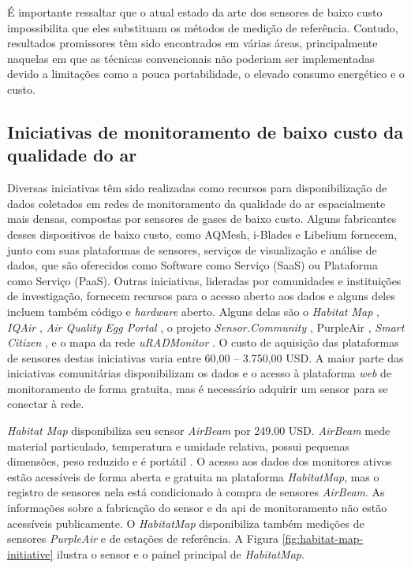É importante ressaltar que o atual estado da arte dos sensores de baixo custo impossibilita que eles substituam os métodos de medição de referência. Contudo, resultados promissores têm sido encontrados em várias áreas, principalmente naquelas em que as técnicas convencionais não poderiam ser implementadas devido a limitações como a pouca portabilidade, o elevado consumo energético e o custo.

\subsection{Iniciativas de monitoramento de baixo custo da qualidade do ar}

Diversas iniciativas têm sido realizadas como recursos para disponibilização de dados coletados em redes de monitoramento da qualidade do ar espacialmente mais densas, compostas por sensores de gases de baixo custo. Alguns fabricantes desses dispositivos de baixo custo, como AQMesh, i-Blades e Libelium fornecem, junto com suas plataformas de sensores, serviços de visualização e análise de dados, que são oferecidos como Software como Serviço (SaaS) ou Plataforma como Serviço (PaaS). Outras iniciativas, lideradas por comunidades e instituições de investigação, fornecem recursos para o acesso aberto aos dados e alguns deles incluem também código e \textit{hardware} aberto. Alguns delas são o \textit{Habitat Map} \cite{HabitatMap2023AirCasting}, \textit{IQAir} \cite{IQAir2023}, \textit{Air Quality Egg Portal} \cite{AirQualityEgg2023AirPortal}, o projeto \textit{Sensor.Community} \cite{Sensor.Community2023LuftMap}, PurpleAir \cite{PurpleAir2023PurpleAirMonitoring}, \textit{Smart Citizen} \cite{SmartCitizen2023SmartCitizen}, e o mapa da rede \textit{uRADMonitor} \cite{uRADMonitor2023PM2.5URADMonitor}. O custo de aquisição das plataformas de sensores destas iniciativas varia entre 60,00 – 3.750,00 USD. A maior parte das iniciativas comunitárias disponibilizam os dados e o acesso à plataforma \textit{web} de monitoramento de forma gratuita, mas é necessário adquirir um sensor para se conectar à rede.

\textit{Habitat Map} disponibiliza seu sensor \textit{AirBeam} por 249.00 USD. \textit{AirBeam} mede material particulado, temperatura e umidade relativa, possui pequenas dimensões, peso reduzido e é portátil \cite{HabitatMap2023AirCasting}. O acesso aos dados dos monitores ativos estão acessíveis de forma aberta e gratuita na plataforma \textit{HabitatMap}, mas o registro de sensores nela está condicionado à compra de sensores \textit{AirBeam}. As informações sobre a fabricação do sensor e da \acrshort{api} de monitoramento não estão acessíveis publicamente. O \textit{HabitatMap} disponibiliza também medições de sensores \textit{PurpleAir} e de estações de referência. A Figura \ref{fig:habitat-map-initiative} ilustra o sensor e o painel principal de \textit{HabitatMap}.

